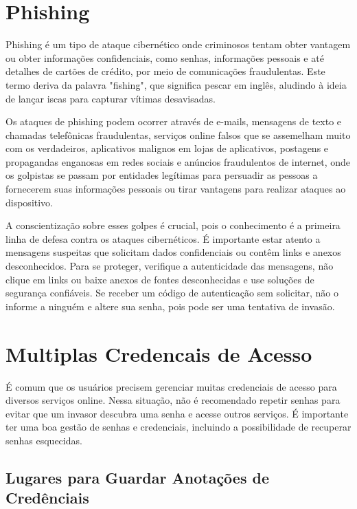 \documentclass[12pt]{article}
\begin{document}
\section{Phishing}

Phishing é um tipo de ataque cibernético onde criminosos tentam obter
vantagem ou obter informações confidenciais, como senhas, informações
pessoais e até detalhes de cartões de crédito, por meio de comunicações
fraudulentas.
Este termo deriva da palavra "fishing", que significa pescar em inglês,
aludindo à ideia de lançar iscas para capturar vítimas desavisadas.

Os ataques de phishing podem ocorrer através de e-mails, mensagens de
texto e chamadas telefônicas fraudulentas, serviços online falsos que
se assemelham muito com os verdadeiros, aplicativos malignos em lojas
de aplicativos, postagens e propagandas enganosas em redes sociais e
anúncios fraudulentos de internet, onde os golpistas se passam por
entidades legítimas para persuadir as pessoas a fornecerem suas informações
pessoais ou tirar vantagens para realizar ataques ao dispositivo.

A conscientização sobre esses golpes é crucial, pois o conhecimento é a
primeira linha de defesa contra os ataques cibernéticos.
É importante estar atento a mensagens suspeitas que solicitam dados
confidenciais ou contêm links e anexos desconhecidos. Para se proteger,
verifique a autenticidade das mensagens, não clique em links ou baixe
anexos de fontes desconhecidas e use soluções de segurança confiáveis.
Se receber um código de autenticação sem solicitar, não o informe a
ninguém e altere sua senha, pois pode ser uma tentativa de invasão.

\section{Multiplas Credencais de Acesso}

É comum que os usuários precisem gerenciar muitas credenciais de acesso
para diversos serviços online.
Nessa situação, não é recomendado repetir senhas para evitar que um invasor
descubra uma senha e acesse outros serviços.
É importante ter uma boa gestão de senhas e credenciais, incluindo a
possibilidade de recuperar senhas esquecidas.

\subsection{Lugares para Guardar Anotações de Credênciais}
\end{document}
